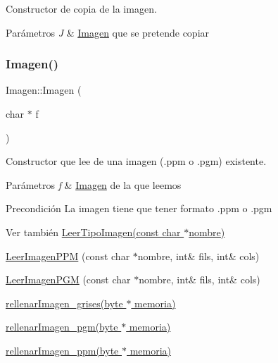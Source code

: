 Constructor de copia de la imagen. 


\begin{DoxyParams}{Parámetros}
{\em J} & \hyperlink{classImagen}{Imagen} que se pretende copiar \\
\hline
\end{DoxyParams}
\mbox{\label{classImagen_a18f5296cfd407b2e2dcbe9c74e2f7f1b}} 
\subsubsection{\texorpdfstring{Imagen()}{Imagen()}\hspace{0.1cm}{\footnotesize\ttfamily [2/3]}}
{\footnotesize\ttfamily Imagen\+::\+Imagen (\begin{DoxyParamCaption}\item[{char $\ast$}]{f }\end{DoxyParamCaption})}



Constructor que lee de una imagen (.ppm o .pgm) existente. 


\begin{DoxyParams}{Parámetros}
{\em f} & \hyperlink{classImagen}{Imagen} de la que leemos \\
\hline
\end{DoxyParams}
\begin{DoxyPrecond}{Precondición}
La imagen tiene que tener formato .ppm o .pgm 
\end{DoxyPrecond}
\begin{DoxySeeAlso}{Ver también}
\hyperlink{imagenES_8cpp_acaa5fb277940aceed29f86c093a3d89c}{Leer\+Tipo\+Imagen(const char $\ast$nombre)} 

\hyperlink{imagenES_8cpp_a05aea20533de5bbd02789f76aafbb99b}{Leer\+Imagen\+P\+PM} (const char $\ast$nombre, int\& fils, int\& cols) 

\hyperlink{imagenES_8cpp_a03340a1e1e4a88385c972bb4af463649}{Leer\+Imagen\+P\+GM} (const char $\ast$nombre, int\& fils, int\& cols) 

\hyperlink{classImagen_a9a3870103cebf6da0f9771628c182ccf}{rellenar\+Imagen\+\_\+grises(byte $\ast$ memoria)} 

\hyperlink{classImagen_a361eeffdebd18fa24810cb8e058287ca}{rellenar\+Imagen\+\_\+pgm(byte $\ast$ memoria)} 

\hyperlink{classImagen_ae16cd735c83eb3d3bcb125affa8e0c99}{rellenar\+Imagen\+\_\+ppm(byte $\ast$ memoria)} 
\end{DoxySeeAlso}
\mbox{\label{classImagen_a7632978f5ae089713e652bb362da1e78}} 
